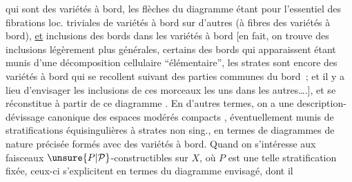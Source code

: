 qui sont des variétés à bord, les  flèches du diagramme étant pour l'essentiel des fibrations loc. triviales de variétés à bord sur d'autres (à fibres des variétés à bord), \uline{et}  inclusions des bords dans les variétés à bord \deleted{(}[en fait, on trouve des inclusions légèrement plus générales, certains des bords qui apparaissent étant munis d'une décomposition cellulaire ``élémentaire'',   les strates  sont encore des variétés à bord qui se recollent suivant des parties communes du bord~; et il y a lieu d'envisager  les inclusions de ces morceaux les uns dans les autres\ldots.\deleted{)}], et se réconstitue à partir de ce diagramme . En d'autres termes, on a une description-dévissage canonique des espaces modérés compacts , éventuellement munis de stratifications équisingulières à strates non sing., en termes de diagrammes  de nature précisée formés avec des variétés à bord. Quand on s'intéresse aux faisceaux  $\unsure{P|\mathcal{P}}$-constructibles sur $X$, où $P$ est une telle stratification fixée, ceux-ci s'explicitent en termes du diagramme envisagé, dont il

